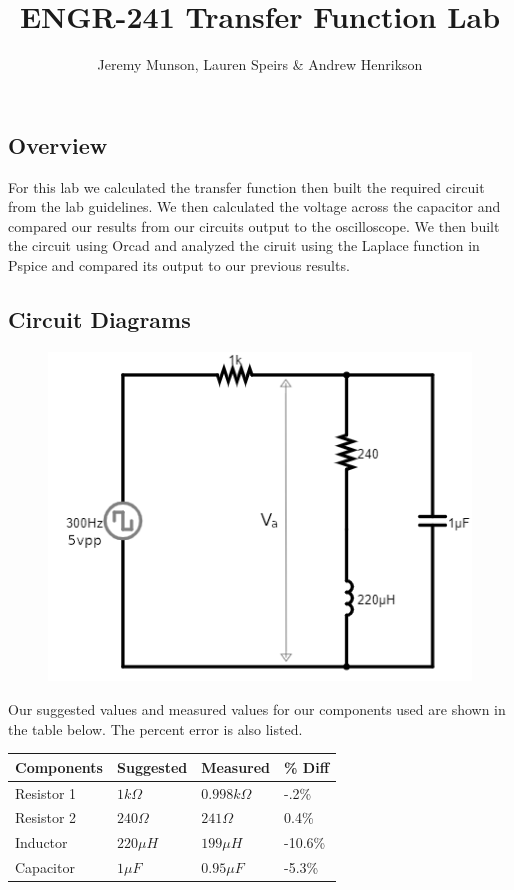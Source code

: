 \documentclass[11pt]{article}
\title{ENGR-241 Transfer Function Lab}
\author{Jeremy Munson, Lauren Speirs \& Andrew Henrikson}
\begin{document}
	\maketitle
	\subsection*{Overview}
	For this lab we calculated the transfer function then built the required circuit from the lab guidelines. We then calculated the voltage across the capacitor and compared our results from our circuits output to the oscilloscope. We then built the circuit using Orcad and analyzed the ciruit using the Laplace function in Pspice and compared its output to our previous results.
	\subsection*{Circuit Diagrams}
	\begin{figure}[H]
		\centering
		\includegraphics[width=5in]{images/diagram.png}
	\end{figure}
	
	Our suggested values and measured values for our components used are shown in the table below. The percent error is also listed.
	\begin{table}[H]
		\def\arraystretch{1.2}%
		\centering
		\begin{tabular}{|l|l|l|l|}
			
			\hline
			Components       	& Suggested 		& Measured      	&\% Diff	\\ \hline
			Resistor 1   		& $1 k\Omega$		& $0.998 k\Omega$   & -.2\%	     \\ \hline	
			Resistor 2			& $240 \Omega$		& $241 \Omega$      & 0.4\%       \\ \hline
			Inductor			& $220\mu H$		& $199\mu H$		& -10.6\%		\\ \hline
			Capacitor			& $1 \mu F$			& $0.95 \mu F$		& -5.3\%		\\ \hline
		\end{tabular}
	\end{table}
	
\end{document}

